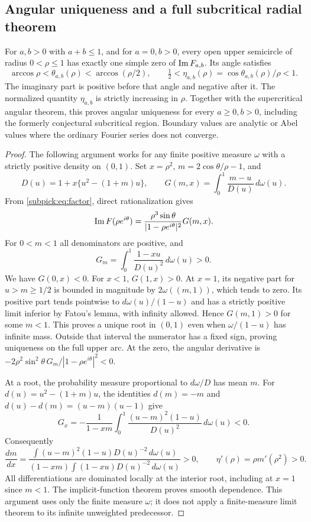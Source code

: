 \subsection{Angular uniqueness and a full subcritical radial theorem}
\begin{theorem}
\label{subpick:thm:radial}
For $a,b>0$ with $a+b\le1$, and for $a=0,b>0$, every open upper
semicircle of radius $0<\rho\le1$ has exactly one simple zero of
$\operatorname{Im} F_{a,b}$. Its angle satisfies
\[
 \arccos\rho<\theta_{a,b}(\rho)<\arccos(\rho/2),
 \qquad \tfrac12<\eta_{a,b}(\rho)=\cos\theta_{a,b}(\rho)/\rho<1.
\]
The imaginary part is positive before that angle and negative after it.
The normalized quantity $\eta_{a,b}$ is strictly increasing in $\rho$.
Together with the supercritical angular theorem, this proves angular
uniqueness for every $a\ge0,b>0$, including the formerly conjectural
subcritical region. Boundary values are analytic or Abel values where
the ordinary Fourier series does not converge.
\end{theorem}
\begin{proof}
The following argument works for any finite positive measure $\omega$
with a strictly positive density on $(0,1)$. Set $x=\rho^2$,
$m=2\cos\theta/\rho-1$, and
\[
 D(u)=1+x\{u^2-(1+m)u\},\qquad
 G(m,x)=\int_0^1\frac{m-u}{D(u)}\,d\omega(u).
\]
From \eqref{subpick:eq:factor}, direct rationalization gives
\[
 \operatorname{Im} F(\rho e^{i\theta})
  =\frac{\rho^3\sin\theta}{|1-\rho e^{i\theta}|^2}G(m,x).
\]
For $0<m<1$ all denominators are positive, and
\[
 G_m=\int_0^1\frac{1-xu}{D(u)^2}\,d\omega(u)>0.
\]
We have $G(0,x)<0$. For $x<1$, $G(1,x)>0$.
At $x=1$, its negative part for $u>m\ge1/2$ is bounded in magnitude
by $2\omega((m,1))$, which tends to zero. Its positive part tends
pointwise to $d\omega(u)/(1-u)$ and has a strictly positive limit
inferior by Fatou's lemma, with infinity allowed. Hence $G(m,1)>0$
for some $m<1$. This proves a unique root in $(0,1)$ even when
$\omega/(1-u)$ has infinite mass. Outside that interval the numerator
has a fixed sign, proving uniqueness on the full upper arc.
At the zero, the angular derivative is
$-2\rho^2\sin^2\theta\,G_m/|1-\rho e^{i\theta}|^2<0$.

At a root, the probability measure proportional to $d\omega/D$ has
mean $m$. For $d(u)=u^2-(1+m)u$, the identities
$d(m)=-m$ and $d(u)-d(m)=(u-m)(u-1)$ give
\[
 G_x=-\frac1{1-xm}\int_0^1
                 \frac{(u-m)^2(1-u)}{D(u)^2}\,d\omega(u)<0.
\]
Consequently
\[
 \frac{dm}{dx}
 =\frac{\displaystyle\int (u-m)^2(1-u)D(u)^{-2}\,d\omega(u)}
 {(1-xm)\displaystyle\int(1-xu)D(u)^{-2}\,d\omega(u)}>0,
 \qquad \eta'(\rho)=\rho m'(\rho^2)>0.
\]
All differentiations are dominated locally at the interior root,
including at $x=1$ since $m<1$. The implicit-function theorem proves
smooth dependence. This argument uses only the finite measure $\omega$;
it does not apply a finite-measure limit theorem to its infinite
unweighted predecessor.
\end{proof}


